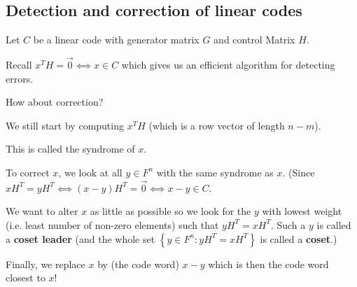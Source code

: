\documentclass[english]{lbscript}
\begin{document}
\subsection{Detection and correction of linear codes}
\label{sec:detect-corr-line}

Let \(C\) be a linear code with generator matrix \(G\) and control Matrix \(H\).

Recall \(x^{T}H=\vec{0}⟺x∈C\) which gives us an efficient algorithm for detecting errors.

How about correction?

We still start by computing \(x^{T}H\) (which is a row vector of length \(n-m\)).

This is called the syndrome of \(x\).

To correct \(x\), we look at all \(y∈F^{n}\) with the same syndrome as \(x\). (Since \(xH^{T}=yH^{T}⟺(x-y)H^{T}=\vec{0}⟺x-y∈C\).

We want to alter \(x\) as little as possible so we look for the \(y\) with lowest weight (i.e. least number of non-zero elements) such that \(yH^{T}=xH^{T}\). Such a \(y\) is called a \textbf{coset leader} (and the whole set \(\left\{ y∈F^{n}: yH^{T}=xH^{T} \right\} \) is called a \textbf{coset}.)

Finally, we replace \(x\) by (the code word) \(x-y\) which is then the code word closest to \(x\)!
\end{document}
